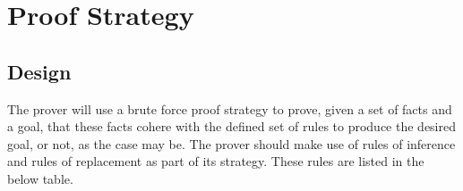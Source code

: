 \documentclass{l4proj}
\begin{document}
\section{Proof Strategy}



\subsection{Design}
The prover will use a brute force proof strategy to prove, given a set of facts and a goal, that these facts cohere with the defined set of rules to produce the desired goal, or not, as the case may be. The prover should make use of rules of inference and rules of replacement as part of its strategy. These rules are listed in the below table\cite{infrules}. 
\end{document}
